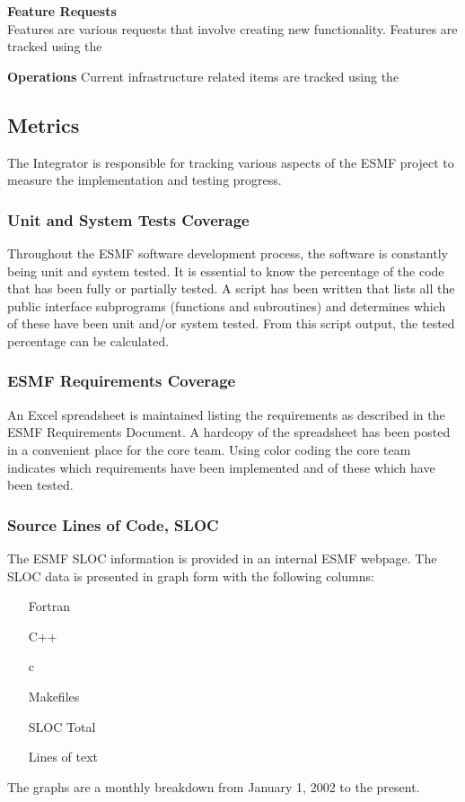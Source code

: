 {\bf Feature Requests}\\

Features are various requests that involve creating new functionality. Features are tracked using the 

{\bf Operations}
Current infrastructure related items are tracked using the

\subsection{Metrics}

The Integrator is responsible for tracking various aspects of the
ESMF project to measure the implementation and testing progress.
\subsubsection{Unit and System Tests Coverage}
Throughout the ESMF software development process, the software is constantly
being unit and system tested. It is essential to know the percentage of the
code that has been fully or partially tested. A script has been written that 
lists all the public interface subprograms (functions and subroutines) and 
determines which of these have been unit and/or system tested. From this script
output, the tested percentage can be calculated.
\subsubsection{ESMF Requirements Coverage}
An Excel spreadsheet is maintained listing the requirements as described in the
ESMF Requirements Document. A hardcopy of the spreadsheet has been posted in a
convenient place for the core team. Using color coding the core team indicates
which requirements have been implemented and of these which have been tested.
\subsubsection{Source Lines of Code, SLOC}
The ESMF SLOC information is provided in an internal ESMF webpage. The
SLOC data is presented in graph form with the following columns:
\begin{enumerate}
\item[Fortran] 
\item[C++] 
\item[c] 
\item[Makefiles] 
\item[SLOC Total] 
\item[Lines of text] 
\end{enumerate}

The graphs are a monthly breakdown from January 1, 2002 to the present.
























